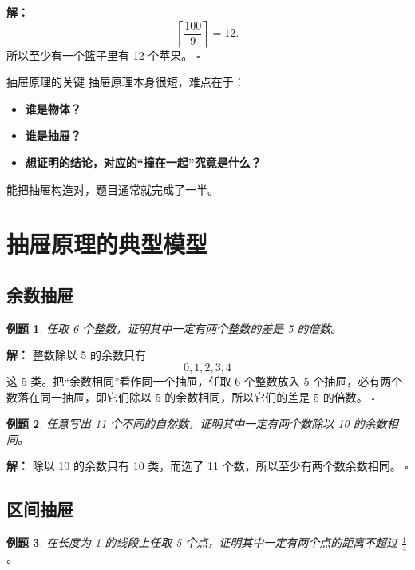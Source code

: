 \documentclass[11pt,a4paper,fontset=fandol]{ctexart}
\theoremstyle{formaltheorem}
\theoremstyle{formalexample}
\newtheorem{example}{例题}[section]
\newenvironment{solution}{\par\noindent\textbf{解：}}{\hfill$\square$\par}
\begin{document}
\begin{solution}
\[
\left\lceil \frac{100}{9}\right\rceil=12.
\]
所以至少有一个篮子里有 12 个苹果。
\end{solution}

\begin{skillbox}{抽屉原理的关键}
抽屉原理本身很短，难点在于：
\begin{itemize}
  \item \textbf{谁是物体？}
  \item \textbf{谁是抽屉？}
  \item \textbf{想证明的结论，对应的“撞在一起”究竟是什么？}
\end{itemize}
能把抽屉构造对，题目通常就完成了一半。
\end{skillbox}

\section{抽屉原理的典型模型}

\subsection{余数抽屉}
\begin{example}
任取 6 个整数，证明其中一定有两个整数的差是 5 的倍数。
\end{example}

\begin{solution}
整数除以 5 的余数只有
\[
0,1,2,3,4
\]
这 5 类。把“余数相同”看作同一个抽屉，任取 6 个整数放入 5 个抽屉，必有两个数落在同一抽屉，即它们除以 5 的余数相同，所以它们的差是 5 的倍数。
\end{solution}

\begin{example}
任意写出 11 个不同的自然数，证明其中一定有两个数除以 10 的余数相同。
\end{example}

\begin{solution}
除以 10 的余数只有 10 类，而选了 11 个数，所以至少有两个数余数相同。
\end{solution}

\subsection{区间抽屉}
\begin{example}
在长度为 1 的线段上任取 5 个点，证明其中一定有两个点的距离不超过 $\frac14$。
\end{example}
\end{document}
